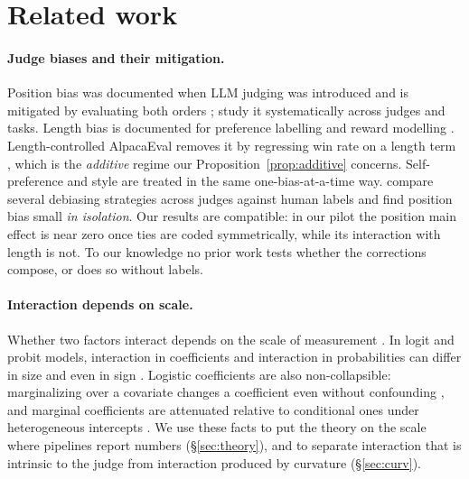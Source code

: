 \documentclass[10pt]{article}
\theoremstyle{remark}
\begin{document}
\section{Related work}
\label{sec:related}

\paragraph{Judge biases and their mitigation.}
Position bias was documented when LLM judging was introduced
\citep{zheng2023judging} and is mitigated by evaluating both orders
\citep{wang2023fair}; \citet{shi2024position} study it systematically
across judges and tasks. Length bias is documented for preference
labelling \citep{saito2023verbosity} and reward modelling
\citep{singhal2023long}. Length-controlled AlpacaEval removes it by
regressing win rate on a length term \citep{dubois2024length}, which is
the \emph{additive} regime our Proposition~\ref{prop:additive} concerns.
Self-preference \citep{panickssery2024llm,wataoka2024selfpref} and style
\citep{wu2023style} are treated in the same one-bias-at-a-time way.
\citet{soumik2026mitigation} compare several debiasing strategies
across judges against human labels and find position bias small
\emph{in isolation}. Our results are compatible: in our pilot the
position main effect is near zero once ties are coded symmetrically,
while its interaction with length is not. To our knowledge no prior work
tests whether the corrections compose, or does so without labels.

\paragraph{Interaction depends on scale.}
Whether two factors interact depends on the scale of measurement
\citep{vanderweele2014tutorial}. In logit and probit models, interaction
in coefficients and interaction in probabilities can differ in size and
even in sign \citep{ai2003interaction}. Logistic coefficients are also
non-collapsible: marginalizing over a covariate changes a coefficient
even without confounding \citep{greenland1999collapsibility}, and
marginal coefficients are attenuated relative to conditional ones under
heterogeneous intercepts \citep{zeger1988gee}. We use these facts to
put the theory on the scale where pipelines report numbers
(\S\ref{sec:theory}), and to separate interaction that is intrinsic to
the judge from interaction produced by curvature (\S\ref{sec:curv}).
\end{document}
